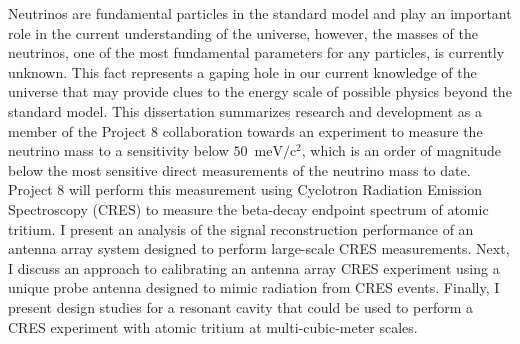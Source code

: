 
\vspace{-0.3in}

Neutrinos are fundamental particles in the standard model and play an important role in the current understanding of the universe, however, the masses of the neutrinos, one of the most fundamental parameters for any particles, is currently unknown. This fact represents a gaping hole in our current knowledge of the universe that may provide clues to the energy scale of possible physics beyond the standard model. This dissertation summarizes research and development as a member of the Project 8 collaboration towards an experiment to measure the neutrino mass to a sensitivity below $50$~$\mathrm{meV}/\mathrm{c}^2$, which is an order of magnitude below the most sensitive direct measurements of the neutrino mass to date. Project 8 will perform this measurement using Cyclotron Radiation Emission Spectroscopy (CRES) to measure the beta-decay endpoint spectrum of atomic tritium. I present an analysis of the signal reconstruction performance of an antenna array system designed to perform large-scale CRES measurements. Next, I discuss an approach to calibrating an antenna array CRES experiment using a unique probe antenna designed to mimic radiation from CRES events. Finally, I present design studies for a resonant cavity that could be used to perform a CRES experiment with atomic tritium at multi-cubic-meter scales.